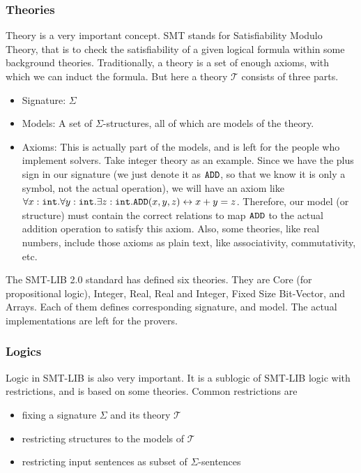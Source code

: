 \documentclass[10pt,letter]{article}
\theoremstyle{definition}
\begin{document}
\subsubsection{Theories}
Theory is a very important concept. SMT stands for Satisfiability Modulo Theory, that is to check the satisfiability of a given logical formula within some background theories. Traditionally, a theory is a set of enough axioms, with which we can induct the formula. But here a theory $\mathcal{T}$ consists of three parts.
\begin{itemize}
\item Signature: $\Sigma$
\item Models: A set of $\Sigma$-structures, all of which are models of the theory.
\item Axioms: This is actually part of the models, and is left for the people who implement solvers. Take integer theory as an example. Since we have the plus sign in our signature (we just denote it as $\tt ADD$, so that we know it is only a symbol, not the actual operation), we will have an axiom like $\forall x:{\tt int}.\forall y:{\tt int}. \exists z:{\tt int}. {\tt ADD}(x,y,z) \leftrightarrow x + y = z$. Therefore, our model (or structure) must contain the correct relations to map $\tt ADD$ to the actual addition operation to satisfy this axiom. Also, some theories, like real numbers, include those axioms as plain text, like associativity, commutativity, etc.

\end{itemize}

The SMT-LIB 2.0 standard has defined six theories. They are Core (for propositional logic), Integer, Real, Real and Integer, Fixed Size Bit-Vector, and Arrays. Each of them defines corresponding signature, and model. The actual implementations are left for the provers.

\subsubsection{Logics}
Logic in SMT-LIB is also very important. It is a sublogic of SMT-LIB logic with restrictions, and is based on some theories. Common restrictions are
\begin{itemize}
\item fixing a signature $\Sigma$ and its theory $\mathcal{T}$
\item restricting structures to the models of $\mathcal{T}$
\item restricting input sentences as subset of $\Sigma$-sentences
\end{itemize}
\end{document}
